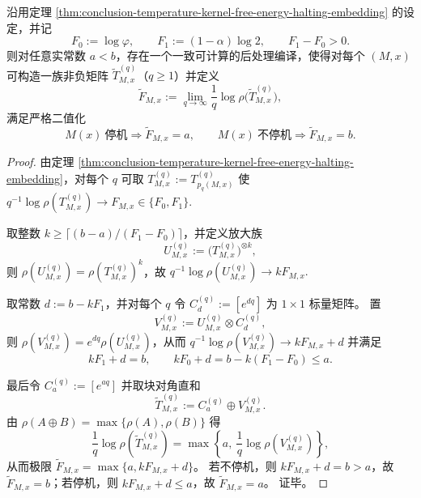 \begin{corollary}[二点谱的常数对可编译性]\label{cor:conclusion-temperature-kernel-free-energy-two-point-any-constants}
沿用定理 \ref{thm:conclusion-temperature-kernel-free-energy-halting-embedding} 的设定，并记
\[
F_0:=\log\varphi,
\qquad
F_1:=(1-\alpha)\log 2,
\qquad
F_1-F_0>0.
\]
则对任意实常数 \(a<b\)，存在一个一致可计算的后处理编译，使得对每个 \((M,x)\) 可构造一族非负矩阵 \(\widetilde T_{M,x}^{(q)}\)（\(q\ge 1\)）并定义
\[
\widetilde F_{M,x}:=\lim_{q\to\infty}\frac1q\log\rho\!\bigl(\widetilde T^{(q)}_{M,x}\bigr),
\]
满足严格二值化
\[
M(x)\ \text{停机}\Longrightarrow \widetilde F_{M,x}=a,
\qquad
M(x)\ \text{不停机}\Longrightarrow \widetilde F_{M,x}=b.
\]
\end{corollary}
\begin{proof}
由定理 \ref{thm:conclusion-temperature-kernel-free-energy-halting-embedding}，对每个 \(q\) 可取
\(
T^{(q)}_{M,x}:=T^{(q)}_{p_q(M,x)}
\)
使
\(
q^{-1}\log\rho(T^{(q)}_{M,x})\to F_{M,x}\in\{F_0,F_1\}.
\)
\par
取整数 \(k\ge \lceil (b-a)/(F_1-F_0)\rceil\)，并定义放大族
\[
U^{(q)}_{M,x}:=\bigl(T^{(q)}_{M,x}\bigr)^{\otimes k},
\]
则 \(\rho(U^{(q)}_{M,x})=\rho(T^{(q)}_{M,x})^{k}\)，故
\(
q^{-1}\log\rho(U^{(q)}_{M,x})\to kF_{M,x}.
\)
\par
取常数 \(d:=b-kF_1\)，并对每个 \(q\) 令 \(C_d^{(q)}:=[e^{dq}]\) 为 \(1\times 1\) 标量矩阵。
置
\[
V^{(q)}_{M,x}:=U^{(q)}_{M,x}\otimes C_d^{(q)},
\]
则 \(\rho(V^{(q)}_{M,x})=e^{dq}\rho(U^{(q)}_{M,x})\)，从而
\(
q^{-1}\log\rho(V^{(q)}_{M,x})\to kF_{M,x}+d
\)
并满足
\[
kF_1+d=b,
\qquad
kF_0+d=b-k(F_1-F_0)\le a.
\]
\par
最后令 \(C_a^{(q)}:=[e^{aq}]\) 并取块对角直和
\[
\widetilde T^{(q)}_{M,x}:=C_a^{(q)}\oplus V^{(q)}_{M,x}.
\]
由 \(\rho(A\oplus B)=\max\{\rho(A),\rho(B)\}\) 得
\[
\frac1q\log\rho(\widetilde T^{(q)}_{M,x})
=\max\!\left\{a,\ \frac1q\log\rho(V^{(q)}_{M,x})\right\},
\]
从而极限 \(\widetilde F_{M,x}=\max\{a,kF_{M,x}+d\}\)。
若不停机，则 \(kF_{M,x}+d=b>a\)，故 \(\widetilde F_{M,x}=b\)；若停机，则 \(kF_{M,x}+d\le a\)，故 \(\widetilde F_{M,x}=a\)。
证毕。
\end{proof}

